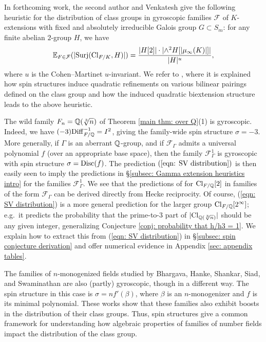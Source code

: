 \documentclass[11pt,a4paper]{amsart}
\def\Q{{\rm \mathbb{Q}}}
\def\Cl{{\rm Cl}}
\def\Diff{{\rm Diff}}
\def\Disc{{\rm Disc}}
\numberwithin{equation}{section}
\begin{document}
In forthcoming work, the second author and Venkatesh \cite{SiadVenkatesh} give the following heuristic for the distribution of class groups in gyroscopic families
$\mathcal{F}$ of $K$-extensions with fixed and absolutely irreducible Galois group $G \subset S_m$: for any finite abelian $2$-group $H$, we have 
\begin{equation} \label{eqn: SV distribution}
   \mathbb{E}_{F \in \mathcal{F}}(|\mathrm{Surj}(\Cl_{F/K},H)|) =  \frac{\lvert H[2] \rvert \cdot  \lvert \wedge^2 H[|\mu_\infty(K)|]\rvert}{|H|^u},
\end{equation}
where $u$ is the Cohen--Martinet $u$-invariant. We refer to \cite{SiadVenkatesh}, where it is explained how spin structures induce quadratic refinements on various bilinear pairings defined on the class group and how the induced quadratic biextension structure leads to the above heuristic.

The wild family $F_n = \Q(\sqrt[3]{n})$ of Theorem \ref{main thm: over Q}(1) is gyroscopic. Indeed, we have $(-3)\Diff^{-1}_{F/\Q} =  I^2$, giving the family-wide spin structure $\sigma = -3.$  More generally, if $\Gamma$ is an aberrant $\Q$-group, and if $\mathcal{F}_\Gamma$ admits a universal polynomial $f$ (over an appropriate base space), then the family $\mathcal{F}_\Gamma^1$ is gyroscopic with spin structure $\sigma = \Disc(f)$. The prediction $(\ref{eqn: SV distribution})$ is then easily seen to imply the predictions in \S \ref{subsec: Gamma extension heuristics intro} for the families $\mathcal{F}_\Gamma^1$. We see that the predictions of \cite{SiadVenkatesh} for $\Cl_{F/\Q}[2]$ in families of the form $\mathcal{F}_\Gamma$ can be derived directly from Hecke reciprocity. Of course, (\ref{eqn: SV distribution}) is a more general prediction for the larger group $\Cl_{F/\Q}[2^\infty]$; e.g.\ it predicts the probability that the prime-to-$3$ part of $|\Cl_{\Q(\sqrt[3]{n})}|$ should be any given integer, generalizing Conjecture \ref{conj: probability that h/h3 = 1}. We explain how to extract this from (\ref{eqn: SV distribution}) in \S \ref{subsec: spin conjecture derivation} and offer numerical evidence in Appendix \ref{sec: appendix tables}. 
  

The families of $n$-monogenized fields studied by Bhargava, Hanke, Shankar, Siad, and Swaminathan \cite{BhargavaHankeShankar, 2011.08834, 2011.08842, Swaminathan, ShankarSiadSwaminathan} are also (partly) gyroscopic, though in a different way. The spin structure in this case is $\sigma = nf'(\beta)$, where $\beta$ is an $n$-monogenizer and $f$ is its minimal polynomial. These works show that these families also exhibit boosts in the distribution of their class groups. Thus, spin structures give a common framework for understanding how algebraic properties of families of number fields impact the distribution of the class group. 
\end{document}
